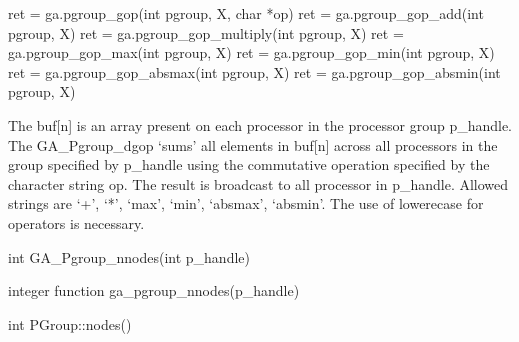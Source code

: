 \documentclass[12pt]{article}
\begin{document}
\begin{pyapi}
\begin{pycode}
ret = ga.pgroup_gop(int pgroup, X, char *op)
ret = ga.pgroup_gop_add(int pgroup, X)
ret = ga.pgroup_gop_multiply(int pgroup, X)
ret = ga.pgroup_gop_max(int pgroup, X)
ret = ga.pgroup_gop_min(int pgroup, X)
ret = ga.pgroup_gop_absmax(int pgroup, X)
ret = ga.pgroup_gop_absmin(int pgroup, X)
\end{pycode}
\begin{funcargs}
\end{funcargs}
\end{pyapi}

\gcoll

\begin{desc}
The buf[n] is an array present on each processor in the processor group
p_handle. The GA_Pgroup_dgop `sums' all elements in buf[n] across all
processors in the group specified by p_handle using the commutative operation
specified by the character string op.  The result is broadcast to all processor
in p_handle. Allowed strings are `+', `*', `max', `min', `absmax', `absmin'.
The use of lowerecase for operators is necessary.
\end{desc}




\begin{capi}
\begin{ccode}
int GA_Pgroup_nnodes(int p_handle)
\end{ccode}
\begin{funcargs}
\end{funcargs}
\end{capi}

\begin{fapi}
\begin{fcode}
integer function ga_pgroup_nnodes(p_handle)
\end{fcode}
\begin{funcargs}
\end{funcargs}
\end{fapi}

\begin{cxxapi}
\begin{cxxcode}
int PGroup::nodes()
\end{cxxcode}
\end{cxxapi}
\end{document}
